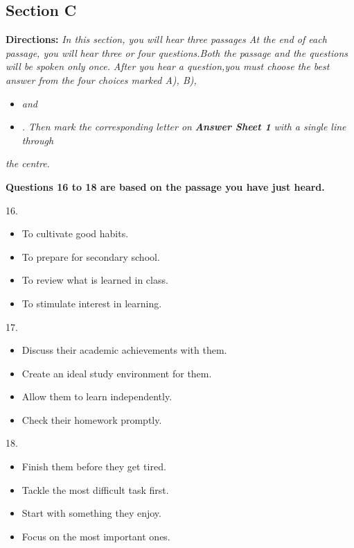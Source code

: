 \documentclass[UTF8,11pt]{ctexart}
\begin{document}
\subsection*{\textbf{Section C}}


\textbf{Directions: }\textit{In this section, you will hear three passages At the end of each passage, you will} \textit{hear three or four questions.Both the passage and the questions will be spoken only once.} \textit{After you hear a question,you must choose the best answer from the four choices marked A), B),}


\begin{itemize}[leftmargin=2em,itemsep=.2em,topsep=.4em]\item[C.] \textit{and}
\item[D.] \textit{. Then mark the corresponding letter on }\textbf{\textit{Answer Sheet 1 }}\textit{with a single line through}
\end{itemize}

\textit{the centre.}


\textbf{Questions 16 to 18 are based on the passage you have just heard.}


16.


\begin{itemize}[leftmargin=2em,itemsep=.2em,topsep=.4em]\item[A.] To cultivate good habits.
\item[B.] To prepare for secondary school.
\item[C.] To review what is learned in class.
\item[D.] To stimulate interest in learning.
\end{itemize}

17.


\begin{itemize}[leftmargin=2em,itemsep=.2em,topsep=.4em]\item[A.] Discuss their academic achievements with them.
\item[B.] Create an ideal study environment for them.
\item[C.] Allow them to learn independently.
\item[D.] Check their homework promptly.
\end{itemize}

18.


\begin{itemize}[leftmargin=2em,itemsep=.2em,topsep=.4em]\item[A.] Finish them before they get tired.
\item[B.] Tackle the most difficult task first.
\item[C.] Start with something they enjoy.
\item[D.] Focus on the most important ones.
\end{itemize}
\end{document}
